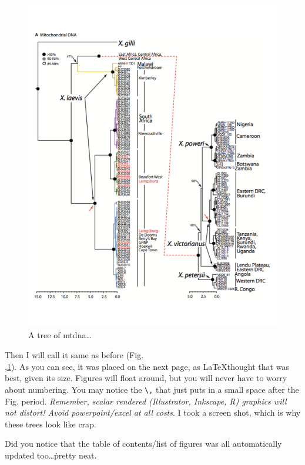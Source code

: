 \begin{figure}[h!] %
	\centering
	\includegraphics[scale=0.6]{Figs/Tree_Fig.pdf}
    \caption[Tree]{A tree of \ac{mtdna}\ldots}
    \label{Tree}
\end{figure}

Then I will call it same as before (Fig.\\,\ref{Tree}). As you can see, it was placed on the next page, as \LaTeX thought that was best, given its size. Figures will float around, but you will never have to worry about numbering. You may notice the \verb+\,+ that just puts in a small space after the Fig. period. \emph{Remember, scalar rendered (Illustrator, Inkscape, R) graphics will not distort! Avoid powerpoint/excel at all costs}. I took a screen shot, which is why these trees look like crap. 

Did you notice that the table of contents/list of figures was all automatically updated too\ldots\.pretty neat. 


